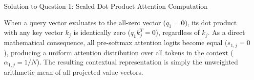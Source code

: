\documentclass[11pt,a4paper]{article}
\begin{document}
\begin{solutionbox}{Solution to Question 1: Scaled Dot-Product Attention Computation}
\begin{takeawaybox}
When a query vector evaluates to the all-zero vector ($q_1 = \mathbf{0}$), its dot product with any key vector $k_j$ is identically zero ($q_1 k_j^T = 0$), regardless of $k_j$. As a direct mathematical consequence, all pre-softmax attention logits become equal ($s_{1,j} = 0$), producing a uniform attention distribution over all tokens in the context ($\alpha_{1,j} = 1/N$). The resulting contextual representation is simply the unweighted arithmetic mean of all projected value vectors.
\end{takeawaybox}
\end{solutionbox}

\newpage

\end{document}
